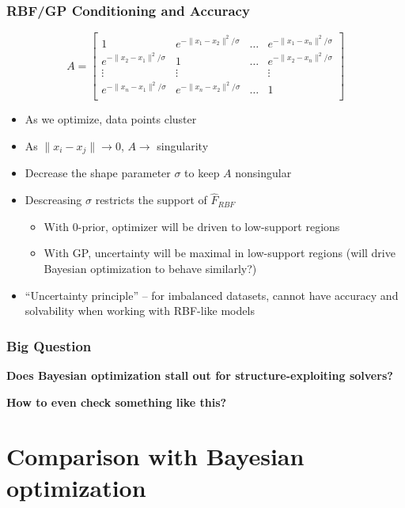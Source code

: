 \documentclass[aspectratio=169]{beamer}
\begin{document}
\begin{frame}\frametitle{RBF/GP Conditioning and Accuracy}
$$
A = 
\left[
\begin{array}{cccc}
1 & e^{-\|x_1 - x_2\|^2/\sigma} & \ldots & e^{-\|x_1 - x_n\|^2/\sigma} \\
e^{-\|x_2 - x_1\|^2/\sigma} & 1 & \ldots & e^{-\|x_2 - x_n\|^2/\sigma} \\
\vdots & \vdots &  & \vdots \\
e^{-\|x_n - x_1\|^2/\sigma} & e^{-\|x_n - x_2\|^2/\sigma} & \ldots & 1 \\
\end{array}
\right]
$$
\begin{itemize}
\pause \item As we optimize, data points cluster
\pause \item As $\|x_i - x_j\| \rightarrow 0$, $A \rightarrow$ singularity
\pause \item Decrease the shape parameter $\sigma$ to keep $A$ nonsingular
\pause \item Descreasing $\sigma$ restricts the support of ${\hat F}_{RBF}$
\begin{itemize}
\pause
\item With 0-prior, optimizer will be driven to low-support regions
\item With GP, uncertainty will be maximal in low-support regions (will drive Bayesian optimization to behave similarly?)
\end{itemize}
\pause \item ``Uncertainty principle'' -- for imbalanced datasets, cannot
have accuracy and solvability when working with RBF-like models
\end{itemize}
\end{frame}

\begin{frame}\frametitle{Big Question}

\begin{center}

{\large \bf
Does Bayesian optimization stall out for structure-exploiting solvers?
}

\pause
\bigskip

{\large \bf
How to even check something like this?
}

\end{center}

\end{frame}

\section{Comparison with Bayesian optimization}
\end{document}
